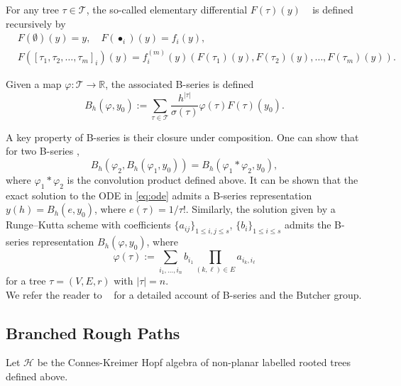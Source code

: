 \documentclass{article}
\theoremstyle{definition}
\theoremstyle{remark}
\begin{document}
For any tree $\tau \in \mathcal{T}$, the so-called elementary differential $F(\tau)(y)$ ~\citep{butcher2016numerical} is defined recursively by
\begin{align*}
    &F(\emptyset)(y) = y, \quad F(\bullet_i)(y) = f_i(y),\\
    &F([\tau_1, \tau_2, \ldots, \tau_m]_i)(y) = f^{(m)}_i(y)(F(\tau_1)(y), F(\tau_2)(y), \ldots, F(\tau_m)(y)).
\end{align*}

Given a map $\varphi: \mathcal{T} \to \mathbb{R}$, the associated B-series is defined
\begin{equation*}
    B_h(\varphi, y_0) := \sum_{\tau \in \mathcal{T}} \frac{h^{|\tau|}}{\sigma(\tau)} \varphi(\tau) F(\tau)(y_0).
\end{equation*}

A key property of B-series is their closure under composition. One can show that for two B-series \cite{hairer1974butcher, butcher2024b},
\begin{equation*}
    B_h(\varphi_2, B_h(\varphi_1, y_0)) = B_h(\varphi_1 * \varphi_2, y_0),
\end{equation*}
where $\varphi_1 * \varphi_2$ is the convolution product defined above. It can be shown that the exact solution to the ODE in \eqref{eq:ode} admits a B-series representation $y(h) = B_h(e, y_0)$, where $e(\tau) = 1 / \tau!$. Similarly, the solution given by a Runge--Kutta scheme with coefficients $\{a_{ij}\}_{1 \leq i,j \leq s}$, $\{b_i\}_{1 \leq i \leq s}$ admits the B-series representation $B_h(\varphi, y_0)$, where \cite[Lemma 312B]{butcher2016numerical}
\begin{equation*}
    \varphi(\tau) := \sum_{i_1, \ldots, i_n} b_{i_1} \prod_{(k,\ell) \in E} a_{i_k, i_\ell}
\end{equation*}
for a tree $\tau = (V,E,r)$ with $|\tau| = n$.\\

We refer the reader to ~\citep{hairer2006geometric,mclachlan2015butcher,butcher2021b} for a detailed account of B-series and the Butcher group.


\subsection{Branched Rough Paths}\label{appendix:branched_rp}

Let $\mathcal{H}$ be the Connes-Kreimer Hopf algebra of non-planar labelled rooted trees defined above.
\end{document}
